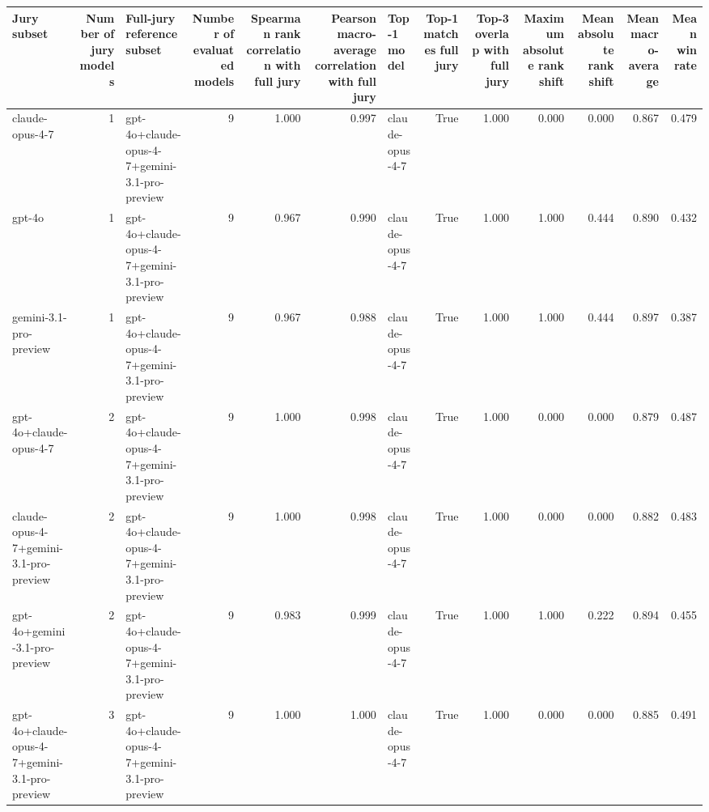 \begin{tabular}{lrlrrrlrrrrrr}
\toprule
Jury subset & Number of jury models & Full-jury reference subset & Number of evaluated models & Spearman rank correlation with full jury & Pearson macro-average correlation with full jury & Top-1 model & Top-1 matches full jury & Top-3 overlap with full jury & Maximum absolute rank shift & Mean absolute rank shift & Mean macro-average & Mean win rate \\
\midrule
claude-opus-4-7 & 1 & gpt-4o+claude-opus-4-7+gemini-3.1-pro-preview & 9 & 1.000 & 0.997 & claude-opus-4-7 & True & 1.000 & 0.000 & 0.000 & 0.867 & 0.479 \\
gpt-4o & 1 & gpt-4o+claude-opus-4-7+gemini-3.1-pro-preview & 9 & 0.967 & 0.990 & claude-opus-4-7 & True & 1.000 & 1.000 & 0.444 & 0.890 & 0.432 \\
gemini-3.1-pro-preview & 1 & gpt-4o+claude-opus-4-7+gemini-3.1-pro-preview & 9 & 0.967 & 0.988 & claude-opus-4-7 & True & 1.000 & 1.000 & 0.444 & 0.897 & 0.387 \\
gpt-4o+claude-opus-4-7 & 2 & gpt-4o+claude-opus-4-7+gemini-3.1-pro-preview & 9 & 1.000 & 0.998 & claude-opus-4-7 & True & 1.000 & 0.000 & 0.000 & 0.879 & 0.487 \\
claude-opus-4-7+gemini-3.1-pro-preview & 2 & gpt-4o+claude-opus-4-7+gemini-3.1-pro-preview & 9 & 1.000 & 0.998 & claude-opus-4-7 & True & 1.000 & 0.000 & 0.000 & 0.882 & 0.483 \\
gpt-4o+gemini-3.1-pro-preview & 2 & gpt-4o+claude-opus-4-7+gemini-3.1-pro-preview & 9 & 0.983 & 0.999 & claude-opus-4-7 & True & 1.000 & 1.000 & 0.222 & 0.894 & 0.455 \\
gpt-4o+claude-opus-4-7+gemini-3.1-pro-preview & 3 & gpt-4o+claude-opus-4-7+gemini-3.1-pro-preview & 9 & 1.000 & 1.000 & claude-opus-4-7 & True & 1.000 & 0.000 & 0.000 & 0.885 & 0.491 \\
\bottomrule
\end{tabular}
